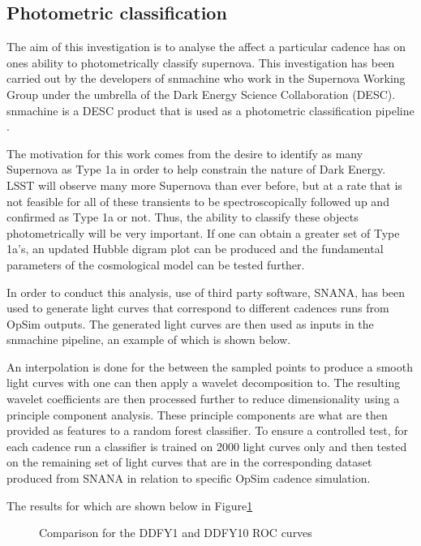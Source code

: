 \subsection{Photometric classification}

The aim of this investigation is to analyse the affect a particular cadence has
on ones ability to photometrically classify supernova. This investigation has been carried out by the
developers of {\sc snmachine} who work in the Supernova Working Group under the umbrella of the Dark Energy Science
Collaboration (DESC). {\sc snmachine} is a DESC product that is used as a photometric
classification pipeline \cite{lochner2016photometric}.

The motivation for this work comes from the desire to identify as many Supernova
as Type 1a in order to help constrain the nature of Dark Energy.
LSST will observe many more Supernova than ever before, but at a rate that is
not feasible for all of these transients to be spectroscopically followed up and
confirmed as Type 1a or not.
Thus, the ability to classify these objects photometrically will be very
important. If one can obtain a greater set of Type 1a's, an updated Hubble
digram plot can be produced and the fundamental parameters of the cosmological
model can be tested further.

In order to conduct this analysis, use of third
party software, {\sc SNANA}, has been used to generate light curves that correspond to
different cadences runs from {\sc OpSim} outputs. The generated light curves are
then used as inputs in the {\sc snmachine} pipeline, an example of which is
shown below.

An interpolation is done for the between the sampled points to produce a smooth
light curves with one can then apply a wavelet decomposition to. The resulting
wavelet coefficients are then processed further to reduce dimensionality using a
principle component analysis. These principle components are what are then
provided as features to a random forest classifier. To ensure a controlled test,
for each cadence run a classifier is trained on 2000 light
curves only and then tested on the remaining set of light curves that are in the
corresponding dataset produced from {\sc SNANA} in relation to specific {\sc OpSim} cadence
simulation. 

The results for which are shown below in Figure\ref{fig:rocs}
\begin{figure}
  \centering
   \caption{Comparison for the DDFY1 and DDFY10 ROC curves}\label{fig:rocs}
\end{figure}

